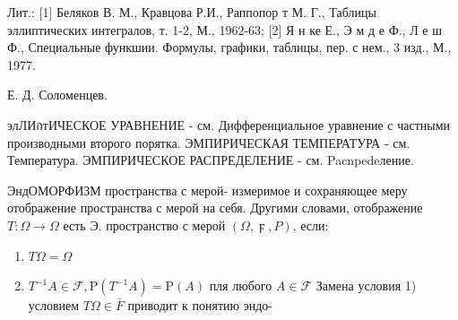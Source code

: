 \documentclass[10pt]{article}
\begin{document}
Лит.: [1] Беляков В. М., Кравцова Р.И., Раппопор т М. Г., Таблицы эллиптических интегралов, т. 1-2, М., 1962-63; [2] Я н ке Е., Э м д е Ф., Л е ш Ф., Специальные функшии. Формулы, графики, таблицы, пер. с нем., 3 изд., М., 1977.



Е. Д. Соломенцев.



элЛИกтИЧЕСКОЕ УРАВНЕНИЕ - см. Дифференциальное уравнение с частными производными второго порятка. ЭМПИРИЧЕСКАЯ ТЕМПЕРАТУРА - см. Температура. ЭМПИРИЧЕСКОЕ РАСПРЕДЕЛЕНИЕ - см. Pacnpedeление.



ЭндОМОРФИЗМ пространства с мерой- измеримое и сохраняющее меру отображение пространства с мерой на себя. Другими словами, отображение $T: \Omega \rightarrow \Omega$ есть Э. пространство с мерой $(\Omega, \digamma, P)$, если:



\begin{enumerate}

  \item $T \Omega=\Omega$



  \item $T^{-1} A \in \mathscr{F}, \mathrm{P}\left(T^{-1} A\right)=\mathrm{P}(A)$ пля любого $A \in \mathcal{F}$ Замена условия 1) условием $T \Omega \in \bar{F}$ приводит к понятию эндо-



\end{enumerate}
\end{document}
